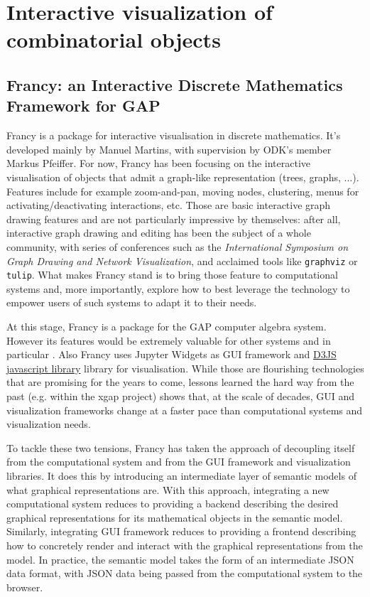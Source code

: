 \documentclass{deliverablereport}
\begin{document}
\section{Interactive visualization of combinatorial objects}
\label{section:combi}

\subsection{Francy: an Interactive Discrete Mathematics Framework for GAP}
\label{section:francy}

Francy is a package for interactive visualisation in discrete
mathematics. It's developed mainly by Manuel Martins, with supervision
by ODK's member Markus Pfeiffer. For now, Francy has been focusing on
the interactive visualisation of objects that admit a graph-like
representation (trees, graphs, ...). Features include for example
zoom-and-pan, moving nodes, clustering, menus for
activating/deactivating interactions, etc. Those are basic interactive
graph drawing features and are not particularly impressive by
themselves: after all, interactive graph drawing and editing has been
the subject of a whole community, with series of conferences such as
the \emph{International Symposium on Graph Drawing and Network
  Visualization}, and acclaimed tools like \lstinline{graphviz} or
\lstinline{tulip}. What makes Francy stand is to bring those feature
to computational systems and, more importantly, explore how to best
leverage the technology to empower users of such systems to adapt it
to their needs.


At this stage, Francy is a package for the GAP computer algebra
system. However its features would be extremely valuable for other
systems and in particular \Sage. Also Francy uses Jupyter Widgets as
GUI framework and \href{d3js.org}{D3JS javascript library} library for
visualisation. %
While those are flourishing technologies that are promising for the
years to come, lessons learned the hard way from the past (e.g. within
the xgap project) shows that, at the scale of decades, GUI and
visualization frameworks change at a faster pace than computational
systems and visualization needs.

To tackle these two tensions, Francy has taken the approach of
decoupling itself from the computational system and from the GUI
framework and visualization libraries. It does this by introducing an
intermediate layer of semantic models of what graphical
representations are. With this approach, integrating a new
computational system reduces to providing a backend describing the
desired graphical representations for its mathematical objects in the
semantic model. Similarly, integrating GUI framework reduces to
providing a frontend describing how to concretely render and interact
with the graphical representations from the model. In practice, the
semantic model takes the form of an intermediate JSON data format,
with JSON data being passed from the computational system to the
browser.
\end{document}
